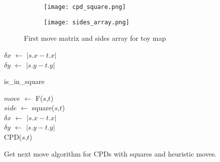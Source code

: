 \begin{figure}[h]
      \centering
      \begin{subfigure}{.35\columnwidth}
      \centering
      \texttt{[image: cpd\_square.png]}
        \caption{}
        \label{fig:results_1}
      \end{subfigure}%
      \begin{subfigure}{.35\columnwidth}
      \texttt{[image: sides\_array.png]}
      \centering
        \caption{}
        \label{fig:results_2}
      \end{subfigure}
      \caption{\small First move matrix and sides array for toy map}
      \label{fig:results}
    \end{figure}




\begin{algorithm}
$\delta x$ $\gets$ $|s.x - t.x|$\\
$\delta y$ $\gets$ $|s.y - t.y|$\\
\caption{is\_in\_square}\label{alg:1}
\end{algorithm}

 

\begin{algorithm}
$move$ $\gets$ \textsf{F}($s$,$t$) \\
$side$ $\gets$ \textsf{square}($s$,$t$) \\
$\delta x$ $\gets$ $|s.x - t.x|$\\
$\delta y$ $\gets$ $|s.y - t.y|$\\
\Return \textsf{CPD}($s$,$t$) 
\caption{Get next move algorithm for CPDs with squares and heuristic moves.}
\label{alg:2}
\end{algorithm}




